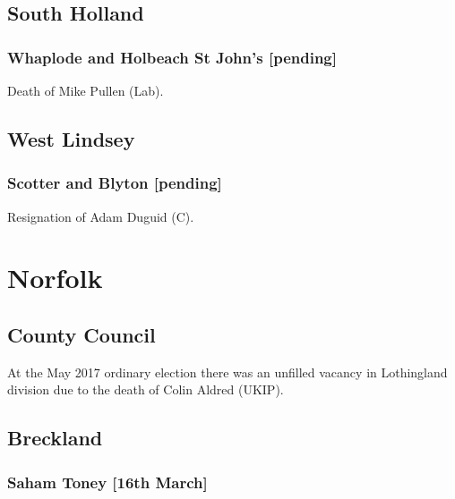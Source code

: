 \documentclass[a4paper,openany]{book}
\begin{document}
\begin{resultsiii}
\subsection*{South Holland}

\subsubsection*{Whaplode and Holbeach St John's \hspace*{\fill}\nolinebreak[1]%
\enspace\hspace*{\fill}
[pending]}


Death of Mike Pullen (Lab).

\subsection*{West Lindsey}

\subsubsection*{Scotter and Blyton \hspace*{\fill}\nolinebreak[1]%
\enspace\hspace*{\fill}
[pending]}


Resignation of Adam Duguid (C).

\section{Norfolk}

\subsection*{County Council}

At the May 2017 ordinary election there was an unfilled vacancy in Lothingland division due to the death of Colin Aldred (UKIP).

\subsection*{Breckland}

\subsubsection*{Saham Toney \hspace*{\fill}\nolinebreak[1]%
\enspace\hspace*{\fill}
[16th March]}


\end{resultsiii}
\end{document}
